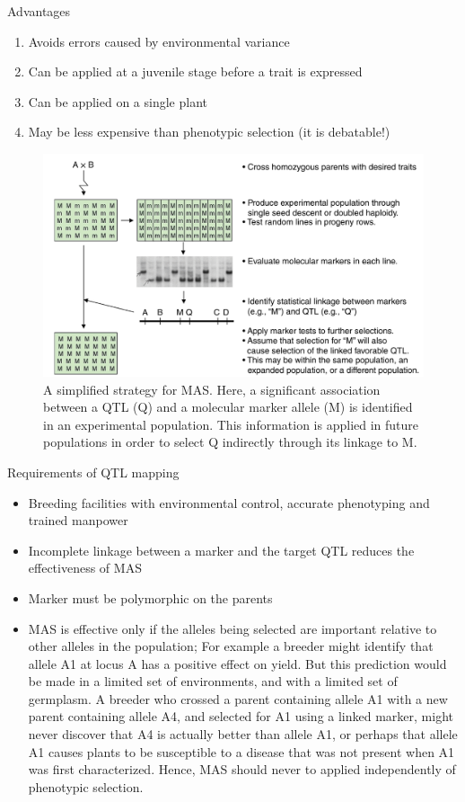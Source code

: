 \documentclass[
  ignorenonframetext,
  aspectratio=169]{beamer}
\providecommand{\tightlist}{%
  \setlength{\itemsep}{0pt}\setlength{\parskip}{0pt}}
\begin{document}
\begin{frame}{Advantages}
\protect\hypertarget{advantages}{}
\begin{enumerate}
\tightlist
\item
  Avoids errors caused by environmental variance
\item
  Can be applied at a juvenile stage before a trait is expressed
\item
  Can be applied on a single plant
\item
  May be less expensive than phenotypic selection (it is debatable!)
\end{enumerate}

\begin{figure}
\includegraphics[width=0.38\linewidth]{../images/marker_assisted_selection} \caption{A simplified strategy for MAS. Here, a significant association between a QTL (Q) and a molecular marker allele (M) is identified in an experimental population. This information is applied in future populations in order to select Q indirectly through its linkage to M.}\label{fig:marker-assisted-selection}
\end{figure}
\end{frame}

\begin{frame}{Requirements of QTL mapping}
\protect\hypertarget{requirements-of-qtl-mapping}{}
\begin{itemize}
\tightlist
\item
  Breeding facilities with environmental control, accurate phenotyping
  and trained manpower
\item
  Incomplete linkage between a marker and the target QTL reduces the
  effectiveness of MAS
\item
  Marker must be polymorphic on the parents
\item
  MAS is effective only if the alleles being selected are important
  relative to other alleles in the population; For example a breeder
  might identify that allele A1 at locus A has a positive effect on
  yield. But this prediction would be made in a limited set of
  environments, and with a limited set of germplasm. A breeder who
  crossed a parent containing allele A1 with a new parent containing
  allele A4, and selected for A1 using a linked marker, might never
  discover that A4 is actually better than allele A1, or perhaps that
  allele A1 causes plants to be susceptible to a disease that was not
  present when A1 was first characterized. Hence, MAS should never to
  applied independently of phenotypic selection.
\end{itemize}
\end{frame}
\end{document}
